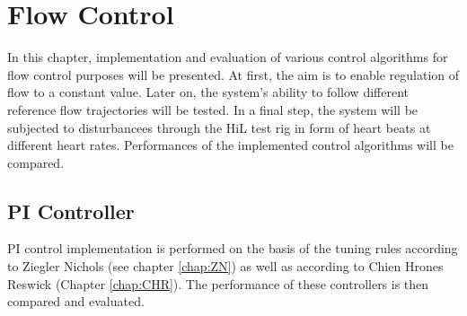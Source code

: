 \chapter{Flow Control}
In this chapter, implementation and evaluation of various control algorithms for flow control purposes will be presented. At first, the aim is to enable regulation of flow to a constant value. Later on, the system's ability to follow different reference flow trajectories will be tested. In a final step, the system will be subjected to disturbancees through the HiL test rig in form of heart beats at different heart rates. Performances of the implemented control algorithms will be compared.


\section{PI Controller}
PI control implementation is performed on the basis of the tuning rules according to Ziegler Nichols (see chapter \ref{chap:ZN}) as well as according to Chien Hrones Reswick (Chapter \ref{chap:CHR}). The performance of these controllers is then compared and evaluated.

